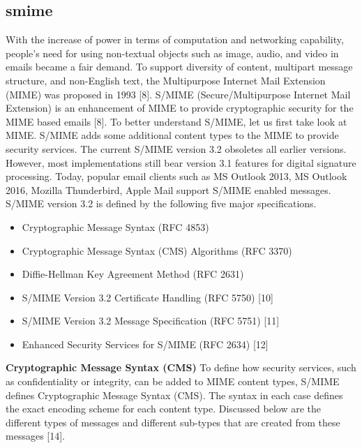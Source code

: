 \subsection{\acrfull{smime}}
\label{chap:analysis-smime}

With the increase of power in terms of computation and networking capability, people’s need for using non-textual objects such as image, audio, and video in emails became a fair demand. To support diversity of content, multipart message structure, and non-English text, the Multipurpose Internet Mail Extension (MIME) was proposed in 1993 [8]. S/MIME (Secure/Multipurpose Internet Mail Extension) is an enhancement of MIME to provide cryptographic security for the MIME based emails [8]. To better understand S/MIME, let us first take look at MIME.
S/MIME adds some additional content types to the MIME to provide security services. The current S/MIME version 3.2 obsoletes all earlier versions. However, most implementations still bear version 3.1 features for digital signature processing. Today, popular email clients such as MS Outlook 2013, MS Outlook 2016, Mozilla Thunderbird, Apple Mail support S/MIME enabled messages.
S/MIME version 3.2 is defined by the following five major specifications.
\begin{itemize}
\item Cryptographic Message Syntax (RFC 4853)
\item Cryptographic Message Syntax (CMS) Algorithms (RFC 3370)
\item Diffie-Hellman Key Agreement Method (RFC 2631)
\item S/MIME Version 3.2 Certificate Handling (RFC 5750) [10]
\item S/MIME Version 3.2 Message Specification (RFC 5751) [11]
\item Enhanced Security Services for S/MIME (RFC 2634) [12]
\end{itemize}
\textbf{Cryptographic Message Syntax (CMS)}
To define how security services, such as confidentiality or integrity, can be added to MIME content types, S/MIME defines Cryptographic Message Syntax (CMS). The syntax in each case defines the exact encoding scheme for each content type. Discussed below are the different types of messages and different sub-types that are created from these messages [14].
